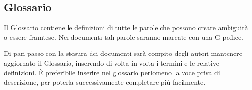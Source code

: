 \subsection{Glossario}

Il Glossario contiene le definizioni di tutte le parole che possono creare ambiguità o essere fraintese. Nei documenti tali parole saranno marcate con una G pedice.

Di pari passo con la stesura dei documenti sarà compito degli autori mantenere aggiornato il Glossario, inserendo di volta in volta i termini e le relative definizioni. È preferibile inserire nel glossario perlomeno la voce priva di descrizione, per poterla successivamente completare più facilmente.